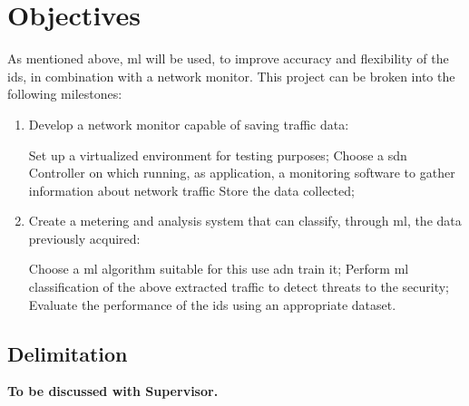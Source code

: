 
\section{Objectives}
\label{sec:objectives}

As mentioned above, \gls{ml} will be used, to improve accuracy and flexibility of the \gls{ids}, in combination with a network monitor. This project can be broken into the following milestones:

\begin{enumerate}
    \item Develop a network monitor capable of saving traffic data:
    \begin{itemize}
        \itemAR Set up a virtualized environment for testing purposes;
        \itemAR Choose a \gls{sdn} Controller on which running, as application, a monitoring software to gather information about network traffic
        \itemAR Store the data collected;
    \end{itemize}
    \item Create a metering and analysis system that can classify, through \gls{ml}, the data previously acquired:
    \begin{itemize}
        \itemAR Choose a \gls{ml} algorithm suitable for this use adn train it;
        \itemAR Perform \gls{ml} classification of the above extracted traffic to detect threats to the security;
        \itemAR Evaluate the performance of the \gls{ids} using an appropriate dataset.
    \end{itemize}
\end{enumerate}


\subsection{Delimitation}
\label{subsec:delimitation}

\faEdit \quad \textbf{To be discussed with Supervisor.} \\

\textcolor{dimgray}{\lipsum[1-2]}

